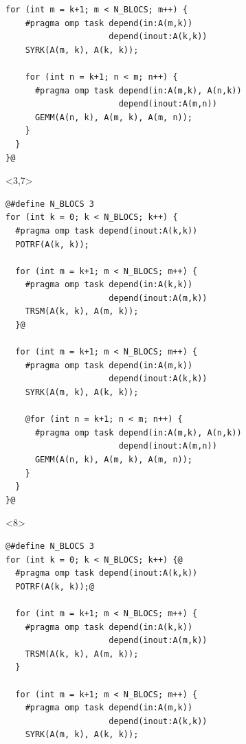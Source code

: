 \documentclass[xcolor={usenames,dvipsnames,svgnames,table}, aspectratio=43]{beamer}
\begin{document}
\begin{frame}[fragile]
\begin{minipage}[t]{0.52\linewidth}
\begin{onlyenv}
\begin{lstlisting}[style=transparency]
  for (int m = k+1; m < N_BLOCS; m++) {
    #pragma omp task depend(in:A(m,k))
                     depend(inout:A(k,k))
    SYRK(A(m, k), A(k, k));

    for (int n = k+1; n < m; n++) {
      #pragma omp task depend(in:A(m,k), A(n,k))
                       depend(inout:A(m,n))
      GEMM(A(n, k), A(m, k), A(m, n));
    }
  }
}@
  \end{lstlisting}
\end{onlyenv}
  \begin{onlyenv}<3,7>
  \begin{lstlisting}[style=transparency]
@#define N_BLOCS 3
for (int k = 0; k < N_BLOCS; k++) {
  #pragma omp task depend(inout:A(k,k))
  POTRF(A(k, k));

  for (int m = k+1; m < N_BLOCS; m++) {
    #pragma omp task depend(in:A(k,k))
                     depend(inout:A(m,k))
    TRSM(A(k, k), A(m, k));
  }@

  for (int m = k+1; m < N_BLOCS; m++) {
    #pragma omp task depend(in:A(m,k))
                     depend(inout:A(k,k))
    SYRK(A(m, k), A(k, k));

    @for (int n = k+1; n < m; n++) {
      #pragma omp task depend(in:A(m,k), A(n,k))
                       depend(inout:A(m,n))
      GEMM(A(n, k), A(m, k), A(m, n));
    }
  }
}@
  \end{lstlisting}
\end{onlyenv}
  \begin{onlyenv}<8>
  \begin{lstlisting}[style=transparency]
@#define N_BLOCS 3
for (int k = 0; k < N_BLOCS; k++) {@
  #pragma omp task depend(inout:A(k,k))
  POTRF(A(k, k));@

  for (int m = k+1; m < N_BLOCS; m++) {
    #pragma omp task depend(in:A(k,k))
                     depend(inout:A(m,k))
    TRSM(A(k, k), A(m, k));
  }

  for (int m = k+1; m < N_BLOCS; m++) {
    #pragma omp task depend(in:A(m,k))
                     depend(inout:A(k,k))
    SYRK(A(m, k), A(k, k));


\end{lstlisting}
\end{onlyenv}
\end{minipage}
\end{frame}
\end{document}
